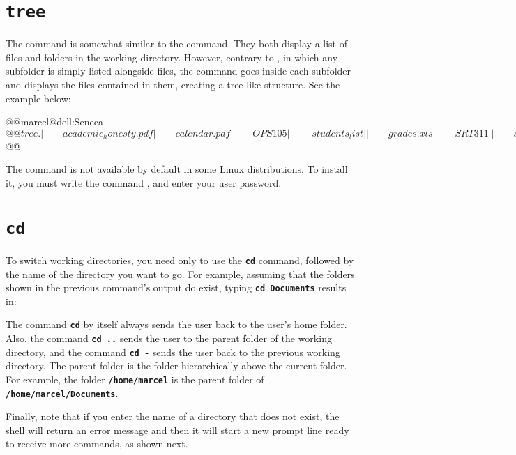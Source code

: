 \section{\textbf{\texttt{tree}}}
The  command is somewhat similar to the  command. They both display a list of files and folders in the working directory. However, contrary to , in which any subfolder is simply listed alongside files, the  command goes inside each subfolder and displays the files contained in them, creating a tree-like structure. See the example below:
\begin{command_line}
@@marcel@dell:Seneca$@@tree
.
|-- academic_honesty.pdf
|-- calendar.pdf
|-- OPS105
|   |-- students_list
|   |-- grades.xls
|-- SRT311
|   |-- students_list
|   |-- grades.xls

2 directories, 6 files
@@marcel@dell:Seneca$@@
\end{command_line}

The  command is not available by default in some Linux distributions. To install it, you must write the command , and enter your user password.

\section{\textbf{\texttt{cd}}}
\label{sub:cd}
To switch working directories, you need only to use the \textbf{\texttt{cd}} command, followed by the name of the directory you want to go. For example, assuming that the folders shown in the previous command's output do exist, typing \textbf{\texttt{cd Documents}} results in:

The command \textbf{\texttt{cd}} by itself always sends the user back to the user's home folder. Also, the command \textbf{\texttt{cd ..}} sends the user to the parent folder of the working directory, and the command \textbf{\texttt{cd -}} sends the user back to the previous working directory. The parent folder is the folder hierarchically above the current folder. For example, the folder \textbf{\texttt{/home/marcel}} is the parent folder of \textbf{\texttt{/home/marcel/Documents}}.

Finally, note that if you enter the name of a directory that does not exist, the shell will return an error message and then it will start a new prompt line ready to receive more commands, as shown next.


